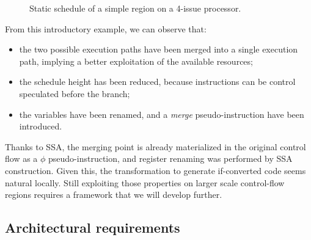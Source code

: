 \begin{figure}

\caption{Static schedule of a simple region on a 4-issue processor. }
\label{fig:example1}
\end{figure}

From this introductory example, we can observe that:
\begin{itemize}
\item the two possible execution paths have been merged into a single execution path, implying a  better exploitation of the available resources;  
\item the schedule height has been reduced, because instructions can be control speculated before the branch;
\item the variables have been renamed, and a \textit{merge} pseudo-instruction have been introduced.
\end{itemize}

Thanks to SSA, the merging point is already materialized in the original control flow as a $\phi$ pseudo-instruction, and register renaming was performed by SSA construction. Given this, the transformation to generate if-converted code seems natural locally. Still exploiting those properties on larger scale control-flow regions requires a framework that we will develop further.

\subsection{Architectural requirements}

